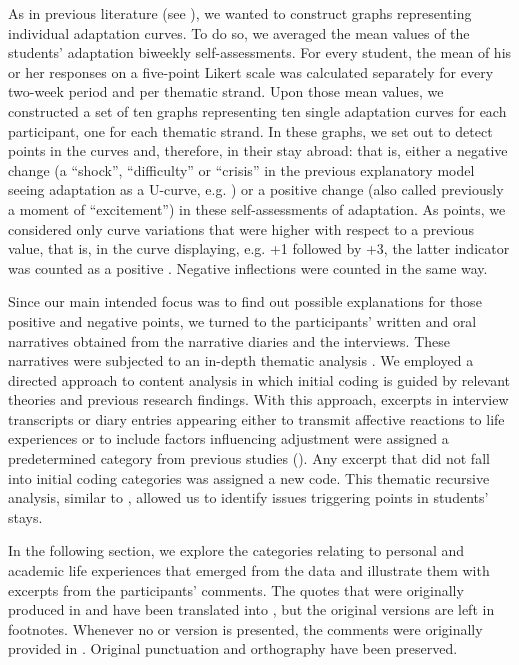 \documentclass[output=paper]{langsci/langscibook}
\begin{document}
As in previous literature (see ), we wanted to construct graphs representing individual adaptation curves. To do so, we averaged the mean values of the students’  adaptation biweekly self-assessments. For every student, the mean of his or her responses on a five-point Likert scale was calculated separately for every two-week period and per thematic strand. Upon those mean values, we constructed a set of ten graphs representing ten single adaptation curves for each participant, one for each thematic strand. In these graphs, we set out to detect  points in the curves and, therefore, in their stay abroad: that is, either a negative change (a “shock”, “difficulty” or “crisis” in the previous explanatory model seeing  adaptation as a U-curve, e.g. \citealt{Lysgaard1955}) or a positive change (also called previously a moment of “excitement”) in these self-assessments of  adaptation. As  points, we considered only curve variations that were higher with respect to a previous value, that is, in the curve displaying, e.g. +1 followed by +3, the latter indicator was counted as a positive . Negative inflections were counted in the same way.  

Since our main intended focus was to find out possible explanations for those positive and negative  points, we turned to the participants’ written and oral narratives obtained from the narrative diaries and the interviews. These narratives were subjected to an in-depth thematic analysis \citep{Lichtman2012}. We employed a directed approach to content analysis in which initial coding is guided by relevant theories and previous research findings. With this approach, excerpts in interview transcripts or diary entries appearing either to transmit affective reactions to life experiences or to include factors influencing adjustment were assigned a predetermined category from previous studies (\citealt{Ward2004,Williams2005,VandeBergEtAl2009,Beaven2012}). Any excerpt that did not fall into initial coding categories was assigned a new code. This thematic recursive analysis, similar to , allowed us to identify issues triggering  points in students’ stays. 

In the following section, we explore the categories relating to personal and academic life experiences that emerged from the data and illustrate them with excerpts from the participants’ comments. The quotes that were originally produced in  and  have been translated into , but the original versions are left in footnotes. Whenever no  or  version is presented, the comments were originally provided in . Original punctuation and orthography have been preserved. 
\end{document}
